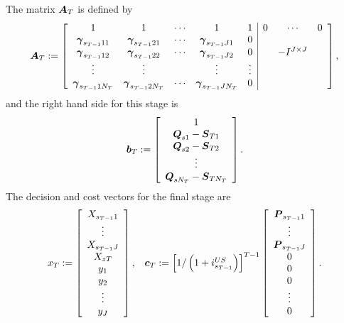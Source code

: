 The matrix $\mathbf{\boldsymbol{A}}_T$ is defined by
\[
\mathbf{\boldsymbol{A}}_{T} := \left[\begin{array}{ccccc|ccc}
1 & 1 & \cdots  & 1 & 1&0 & \cdots & 0\\
\mathbf{\boldsymbol{\gamma}}_{s_{T-1} 1 1} & \mathbf{\boldsymbol{\gamma}}_{s_{T-1} 2 1} & \cdots & \mathbf{\boldsymbol{\gamma}}_{s_{T-1} J 1} & 0& & & \\
\mathbf{\boldsymbol{\gamma}}_{s_{T-1} 1 2} & \mathbf{\boldsymbol{\gamma}}_{s_{T-1} 2 2} & \cdots & \mathbf{\boldsymbol{\gamma}}_{s_{T-1} J 2} & 0& & -I^{J\times J}\\
\vdots & \vdots & & \vdots & \vdots& & &\\
\mathbf{\boldsymbol{\gamma}}_{s_{T-1} 1 N_T} & \mathbf{\boldsymbol{\gamma}}_{s_{T-1} 2 N_T} & \cdots & \mathbf{\boldsymbol{\gamma}}_{s_{T-1} J N_T} & 0&&&\end{array}\right],
\]
and the right hand side for this stage is
\[
	\mathbf{\boldsymbol{b}}_{T} := \left[\begin{array}{c} 1\\ \mathbf{\boldsymbol{Q}}_{s 1} - \mathbf{\boldsymbol{S}}_{T1} \\
\mathbf{\boldsymbol{Q}}_{s 2} - \mathbf{\boldsymbol{S}}_{T2} \\
\vdots\\
\mathbf{\boldsymbol{Q}}_{s N_T} - \mathbf{\boldsymbol{S}}_{TN_T} \end{array}\right].
\]
The decision and cost vectors for the final stage are
\[
\begin{array}{cc} x_T := \left[\begin{array}{c} X_{s_{T-1} 1}\\ \vdots \\ X_{s_{T-1} J}\\ X_{zT}\\ y_1\\ y_2\\ \vdots \\ y_J\end{array}\right], & \mathbf{\boldsymbol{c}}_{T} := \left[1/\left(1+i_{s_{T-1}}^{US}\right)\right]^{T-1}\left[\begin{array}{c}\mathbf{\boldsymbol{P}}_{s_{T-1} 1}\\ \vdots \\ \mathbf{\boldsymbol{P}}_{s_{T-1} J}\\ 0\\ 0\\ 0\\ \vdots \\ 0\end{array}\right].\end{array}
\]

